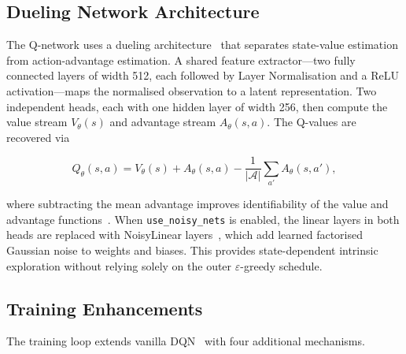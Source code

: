 \documentclass[11pt]{article}
\begin{document}
\subsection{Dueling Network Architecture}

The Q-network uses a dueling architecture~\cite{wang2016} that separates
state-value estimation from action-advantage estimation. A shared feature
extractor---two fully connected layers of width 512, each followed by
Layer Normalisation and a ReLU activation---maps the normalised
observation to a latent representation. Two independent heads, each with
one hidden layer of width 256, then compute the value stream $V_\theta(s)$
and advantage stream $A_\theta(s, a)$. The Q-values are recovered via

\begin{equation}
  Q_\theta(s,a) = V_\theta(s) + A_\theta(s,a) -
  \frac{1}{|\mathcal{A}|}\sum_{a'} A_\theta(s,a'),
  \label{eq:dueling}
\end{equation}

where subtracting the mean advantage improves identifiability of the
value and advantage functions~\cite{wang2016}. When
\texttt{use\_noisy\_nets} is enabled, the linear layers in both heads
are replaced with NoisyLinear layers~\cite{fortunato2018}, which add
learned factorised Gaussian noise to weights and biases. This provides
state-dependent intrinsic exploration without relying solely on the
outer $\varepsilon$-greedy schedule.

\subsection{Training Enhancements}

The training loop extends vanilla DQN~\cite{mnih2015} with four
additional mechanisms.
\end{document}
